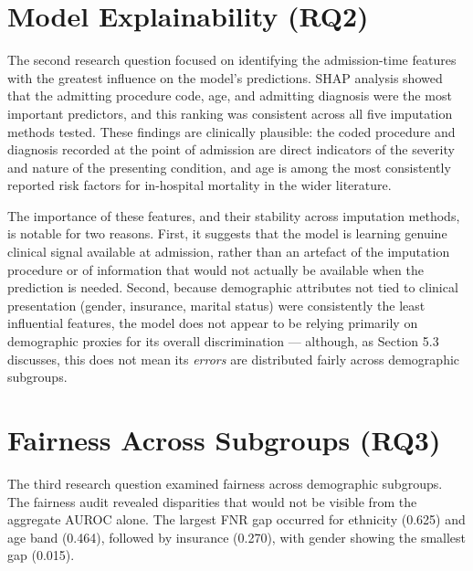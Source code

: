 \documentclass[12pt,a4paper]{report}
\begin{document}
\section{Model Explainability (RQ2)}
The second research question focused on identifying the admission-time features with the greatest influence on the model's predictions. SHAP analysis showed that the admitting procedure code, age, and admitting diagnosis were the most important predictors, and this ranking was consistent across all five imputation methods tested. These findings are clinically plausible: the coded procedure and diagnosis recorded at the point of admission are direct indicators of the severity and nature of the presenting condition, and age is among the most consistently reported risk factors for in-hospital mortality in the wider literature.

The importance of these features, and their stability across imputation methods, is notable for two reasons. First, it suggests that the model is learning genuine clinical signal available at admission, rather than an artefact of the imputation procedure or of information that would not actually be available when the prediction is needed. Second, because demographic attributes not tied to clinical presentation (gender, insurance, marital status) were consistently the least influential features, the model does not appear to be relying primarily on demographic proxies for its overall discrimination --- although, as Section 5.3 discusses, this does not mean its \emph{errors} are distributed fairly across demographic subgroups.


\section{Fairness Across Subgroups (RQ3)}
The third research question examined fairness across demographic subgroups. The fairness audit revealed disparities that would not be visible from the aggregate AUROC alone. The largest FNR gap occurred for ethnicity (0.625) and age band (0.464), followed by insurance (0.270), with gender showing the smallest gap (0.015).
\end{document}
